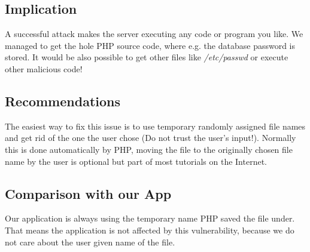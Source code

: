 \subsection{Implication}
A successful attack makes the server executing any code or program you like. We managed to get the hole PHP source code, where e.g. the database password is stored. It would be also possible to get other files like \textit{/etc/passwd} or execute other malicious code!

\subsection{Recommendations}
The easiest way to fix this issue is to use temporary randomly assigned file names and get rid of the one the user chose (Do not trust the user's input!). Normally this is done automatically by PHP, moving the file to the originally chosen file name by the user is optional but part of most tutorials on the Internet.

\subsection{Comparison with our App}
Our application is always using the temporary name PHP saved the file under. That means the application is not affected by this vulnerability, because we do not care about the user given name of the file.